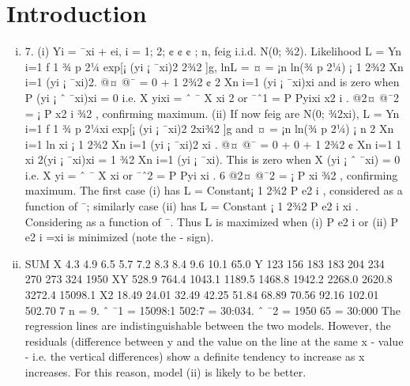 \documentclass{article}
\begin{document}
\section{Introduction}
\begin{enumerate}[(i)]
\item 7. (i) Yi = ¯xi + ei, i = 1; 2; ¢ ¢ ¢ ; n, feig i.i.d. N(0; ¾2).
Likelihood L =
Yn
i=1
f
1
¾
p
2¼
exp[¡
(yi ¡ ¯xi)2
2¾2 ]g,
lnL = ¤ = ¡n ln(¾
p
2¼) ¡ 1
2¾2
Xn
i=1
(yi ¡ ¯xi)2.
@¤
@¯
= 0 +
1
2¾2
¢ 2
Xn
i=1
(yi ¡ ¯xi)xi and is zero when
P
(yi ¡ ˆ ¯xi)xi = 0 i.e.
X
yixi = ˆ ¯
X
xi
2 or ¯ˆ1 =
P
Pyixi
x2
i
.
@2¤
@¯2 = ¡
P
x2
i
¾2 , confirming maximum.
(ii) If now feig are N(0; ¾2xi),
L =
Yn
i=1
f
1
¾
p
2¼xi
exp[¡
(yi ¡ ¯xi)2
2xi¾2 ]g
and ¤ = ¡n ln(¾
p
2¼) ¡ n
2
Xn
i=1
ln xi ¡
1
2¾2
Xn
i=1
(yi ¡ ¯xi)2
xi
.
@¤
@¯
= 0 + 0 +
1
2¾2
¢
Xn
i=1
1
xi
2(yi ¡ ¯xi)xi =
1
¾2
Xn
i=1
(yi ¡ ¯xi).
This is zero when
X
(yi ¡ ˆ ¯xi) = 0 i.e.
X
yi = ˆ ¯
X
xi or ¯ˆ2 =
P
Pyi
xi
.
6
@2¤
@¯2 = ¡
P
xi
¾2 , confirming maximum.
The first case (i) has L = Constant¡ 1
2¾2
P
e2
i , considered as a function of ¯;
similarly case (ii) has L = Constant ¡ 1
2¾2
P e2
i
xi
. Considering as a function
of ¯. Thus L is maximized when (i)
P
e2
i or (ii)
P
e2
i =xi is minimized (note
the - sign).
\item 
SUM
X 4.3 4.9 6.5 5.7 7.2 8.3 8.4 9.6 10.1 65.0
Y 123 156 183 183 204 234 270 273 324 1950
XY 528.9 764.4 1043.1 1189.5 1468.8 1942.2 2268.0 2620.8 3272.4 15098.1
X2 18.49 24.01 32.49 42.25 51.84 68.89 70.56 92.16 102.01 502.70
7
n = 9. ˆ ¯1 = 15098:1
502:7 = 30:034. ˆ ¯2 = 1950
65 = 30:000
The regression lines are indistinguishable between the two models. However,
the residuals (difference between y and the value on the line at the same x
- value - i.e. the vertical differences) show a definite tendency to increase as
x increases. For this reason, model (ii) is likely to be better.
\end{enumerate}
\end{document}
